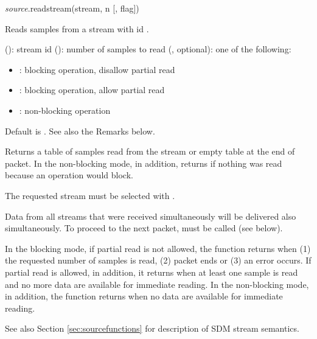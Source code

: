 \documentclass[a4paper,12pt,twoside,extrafontsizes]{memoir}
\begin{document}

\begin{luafuncprototype}
\emph{source}.readstream(stream, n [, flag])
\end{luafuncprototype}

\begin{funcdescr}
	Reads  samples from a stream with id .
\end{funcdescr}

\begin{funcparams}
	 (): stream id
	 (): number of samples to read
	 (, optional): one of the following:
		\begin{itemize}
			\item {}: blocking operation, disallow partial read
			\item {}: blocking operation, allow partial read
			\item {}: non-blocking operation
		\end{itemize}
		
		Default is . See also the Remarks below.
\end{funcparams}

\begin{funcret}
	Returns a table of samples read from the stream or empty table at the end of packet. In the non-blocking mode, in addition, returns  if nothing was read because an operation would block.
\end{funcret}

\begin{funcremarks}
	The requested stream must be selected with .
	
	Data from all streams that were received simultaneously will be delivered also simultaneously. To proceed to the next packet,  must be called (see below).
	
	In the blocking mode, if partial read is not allowed, the function returns when (1) the requested number of samples is read, (2) packet ends or (3) an error occurs. If partial read is allowed, in addition, it returns when at least one sample is read and no more data are available for immediate reading. In the non-blocking mode, in addition, the function returns when no data are available for immediate reading.
	
	See also Section \ref{sec:sourcefunctions} for description of SDM stream semantics.
\end{funcremarks}
\end{document}

